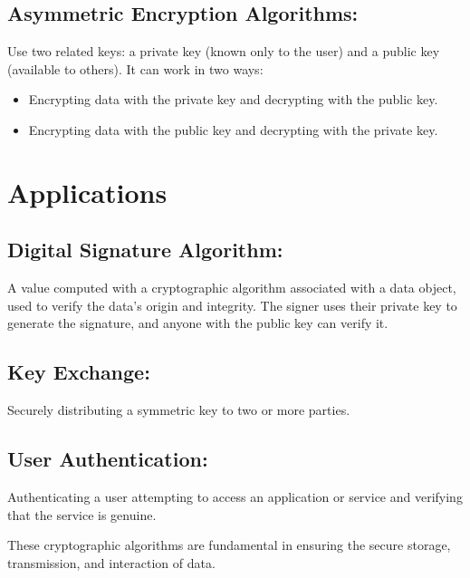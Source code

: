 \subsection{Asymmetric Encryption Algorithms:} 
Use two related keys: a private key (known only to the user) and a public key (available to others). It can work in two ways:
\begin{itemize}
    \item Encrypting data with the private key and decrypting with the public key.
    \item Encrypting data with the public key and decrypting with the private key.
\end{itemize}

\section{Applications}

\subsection{Digital Signature Algorithm:} 
A value computed with a cryptographic algorithm associated with a data object, used to verify the data's origin and integrity. The signer uses their private key to generate the signature, and anyone with the public key can verify it.

\subsection{Key Exchange:} 
Securely distributing a symmetric key to two or more parties.

\subsection{User Authentication:} 
Authenticating a user attempting to access an application or service and verifying that the service is genuine.

These cryptographic algorithms are fundamental in ensuring the secure storage, transmission, and interaction of data.

